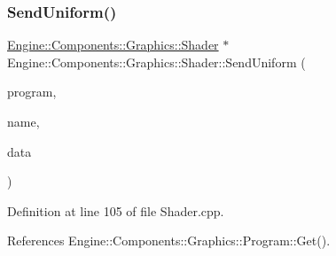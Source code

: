 \mbox{\label{classEngine_1_1Components_1_1Graphics_1_1Shader_a39cbcddb61ef315da0d24a11a650f09a}} 
\subsubsection{\texorpdfstring{Send\+Uniform()}{SendUniform()}\hspace{0.1cm}{\footnotesize\ttfamily [2/6]}}
{\footnotesize\ttfamily \mbox{\hyperlink{classEngine_1_1Components_1_1Graphics_1_1Shader}{Engine\+::\+Components\+::\+Graphics\+::\+Shader}} $\ast$ Engine\+::\+Components\+::\+Graphics\+::\+Shader\+::\+Send\+Uniform (\begin{DoxyParamCaption}\item[{\mbox{\hyperlink{classEngine_1_1Components_1_1Graphics_1_1Program}{Program}} $\ast$}]{program,  }\item[{const G\+Lchar $\ast$}]{name,  }\item[{glm\+::vec4 $\ast$}]{data }\end{DoxyParamCaption})}



Definition at line 105 of file Shader.\+cpp.



References Engine\+::\+Components\+::\+Graphics\+::\+Program\+::\+Get().


